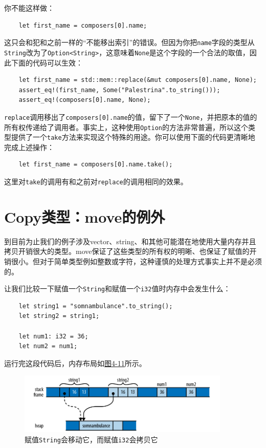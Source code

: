 你不能这样做：
\begin{verbatim}
    let first_name = composers[0].name;
\end{verbatim}

这只会和犯和之前一样的“不能移出索引”的错误。但因为你把\texttt{name}字段的类型从\texttt{String}改为了\texttt{Option<String>}，这意味着\texttt{None}是这个字段的一个合法的取值，因此下面的代码可以生效：
\begin{verbatim}
    let first_name = std::mem::replace(&mut composers[0].name, None);
    assert_eq!(first_name, Some("Palestrina".to_string()));
    assert_eq!(composers[0].name, None);
\end{verbatim}

\texttt{replace}调用移出了\texttt{composers[0].name}的值，留下了一个\texttt{None}，并把原本的值的所有权传递给了调用者。事实上，这种使用\texttt{Option}的方法非常普遍，所以这个类型提供了一个\texttt{take}方法来实现这个特殊的用途。你可以使用下面的代码更清晰地完成上述操作：
\begin{verbatim}
    let first_name = composers[0].name.take();
\end{verbatim}
这里对\texttt{take}的调用有和之前对\texttt{replace}的调用相同的效果。

\section{Copy类型：move的例外}\label{copy}
到目前为止我们的例子涉及vector、string、和其他可能潜在地使用大量内存并且拷贝开销很大的类型。move保证了这些类型的所有权的明晰、也保证了赋值的开销很小。但对于简单类型例如整数或字符，这种谨慎的处理方式事实上并不是必须的。

让我们比较一下赋值一个\texttt{String}和赋值一个\texttt{i32}值时内存中会发生什么：
\begin{verbatim}
    let string1 = "somnambulance".to_string();
    let string2 = string1;

    let num1: i32 = 36;
    let num2 = num1;
\end{verbatim}

运行完这段代码后，内存布局如\hyperref[f4-11]{图4-11}所示。
\begin{figure}[htbp]
    \centering
    \includegraphics[width=0.9\textwidth]{../img/f4-11.png}
    \caption{赋值\texttt{String}会移动它，而赋值\texttt{i32}会拷贝它}
    \label{f4-11}
\end{figure}

